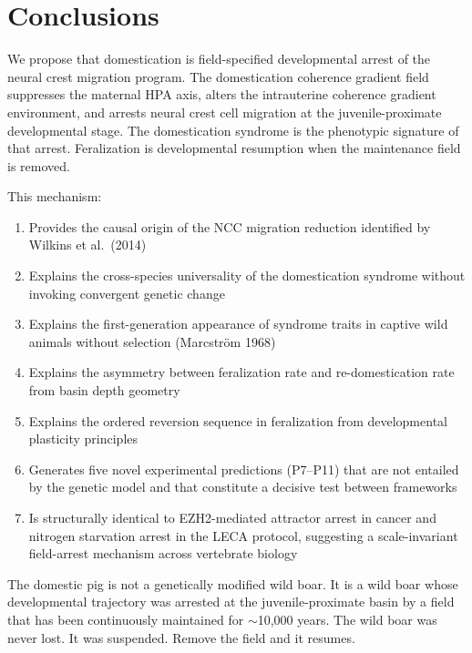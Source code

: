 \documentclass[11pt, a4paper]{article}
\begin{document}
\section{Conclusions}
\label{sec:conclusions}

We propose that domestication is field-specified
developmental arrest of the neural crest migration
program. The domestication coherence gradient field
suppresses the maternal HPA axis, alters the
intrauterine coherence gradient environment,
and arrests neural crest cell migration at the
juvenile-proximate developmental stage. The
domestication syndrome is the phenotypic signature
of that arrest. Feralization is developmental
resumption when the maintenance field is removed.

This mechanism:
\begin{enumerate}[itemsep=0.15em]
  \item Provides the causal origin of the NCC
    migration reduction identified by Wilkins
    et al.\ (2014)
  \item Explains the cross-species universality
    of the domestication syndrome without
    invoking convergent genetic change
  \item Explains the first-generation appearance
    of syndrome traits in captive wild animals
    without selection (Marcstr\"{o}m 1968)
  \item Explains the asymmetry between
    feralization rate and re-domestication rate
    from basin depth geometry
  \item Explains the ordered reversion sequence
    in feralization from developmental plasticity
    principles
  \item Generates five novel experimental predictions
    (P7--P11) that are not entailed by the genetic
    model and that constitute a decisive test
    between frameworks
  \item Is structurally identical to EZH2-mediated
    attractor arrest in cancer and nitrogen
    starvation arrest in the LECA protocol,
    suggesting a scale-invariant field-arrest
    mechanism across vertebrate biology
\end{enumerate}

The domestic pig is not a genetically modified
wild boar. It is a wild boar whose developmental
trajectory was arrested at the juvenile-proximate
basin by a field that has been continuously
maintained for $\sim$10,000 years. The wild boar
was never lost. It was suspended. Remove the
field and it resumes.
\end{document}
